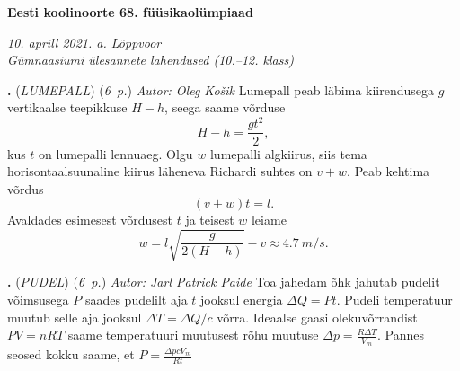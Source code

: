 \documentclass[11pt,a5paper]{article}
\newcommand{\numb}[1]{\vspace{5pt}\textbf{\large #1}}
\newcommand{\nimi}[1]{(\textsl{\small #1})}
\newcommand{\punktid}[1]{(\emph{#1~p.})}
\newcounter{ylesanne}
\newcommand{\yl}[1]{\addtocounter{ylesanne}{1}\numb{\theylesanne.} \nimi{#1} \newblock{}}
\newcommand{\autor}[1]{\emph{ Autor: #1}} %
\begin{document}
\begin{center}
  \textbf{\Large Eesti koolinoorte 68. füüsikaolümpiaad} \par
  \emph{10. aprill 2021. a. Lõppvoor \\Gümnaasiumi ülesannete lahendused (10.--12. klass)}
\end{center}

\yl{LUMEPALL}
\punktid{6} \autor{Oleg Košik}
Lumepall peab läbima kiirendusega $g$ vertikaalse teepikkuse $H-h$, seega saame võrduse
$$H-h=\frac{gt^2}{2},$$ kus $t$ on lumepalli lennuaeg. Olgu $w$ lumepalli algkiirus, siis tema horisontaalsuunaline kiirus läheneva Richardi suhtes on $v+w$. Peab kehtima võrdus $$(v+w)t=l.$$ Avaldades esimesest võrdusest $t$ ja teisest $w$ leiame
$$w=l\sqrt{\frac{g}{2(H-h)}}-v\approx \SI{4,7}{m/s}.$$

\yl{PUDEL}
\punktid{6} \autor{Jarl Patrick Paide}
Toa jahedam õhk jahutab pudelit võimsusega $P$ saades pudelilt aja $t$ jooksul energia $\Delta Q = Pt$. Pudeli temperatuur muutub selle aja jooksul $\Delta T = \Delta Q/c$ võrra. Ideaalse gaasi olekuvõrrandist $PV=nRT$ saame temperatuuri muutusest rõhu muutuse $\Delta p = \frac{R \Delta T}{V_m} $. Pannes seosed kokku saame, et $P = \frac{\Delta p c V_m }{Rt}$
\end{document}
